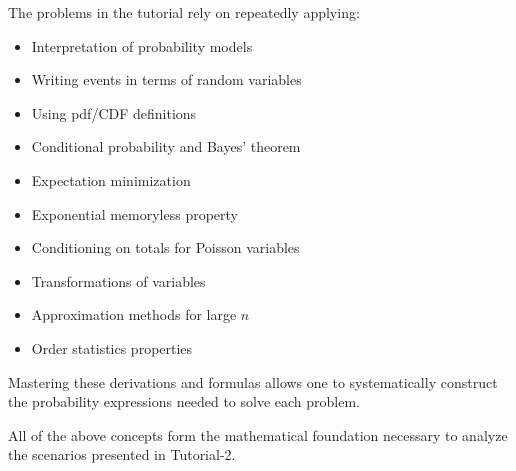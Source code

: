 \documentclass[12pt]{article}
\begin{document}
The problems in the tutorial rely on repeatedly applying:

\begin{itemize}
\item Interpretation of probability models
\item Writing events in terms of random variables
\item Using pdf/CDF definitions
\item Conditional probability and Bayes’ theorem
\item Expectation minimization
\item Exponential memoryless property
\item Conditioning on totals for Poisson variables
\item Transformations of variables
\item Approximation methods for large $n$
\item Order statistics properties
\end{itemize}

Mastering these derivations and formulas allows one to systematically construct the probability expressions needed to solve each problem.

All of the above concepts form the mathematical foundation necessary to analyze the scenarios presented in Tutorial-2.
\end{document}

